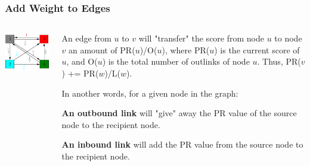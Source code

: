\documentclass{beamer}
\begin{document}
\begin{frame}
\frametitle{Add Weight to Edges}
\begin{columns}
    \begin{column}{0.5\textwidth}
        \includegraphics[width=\textwidth]{weighted.png}
    \end{column}
    \begin{column}{0.5\textwidth}
        \begin{outline}
            
        \end{outline}
        An edge from $u$ to $v$ will "transfer" the score from node $u$ to node $v$ an amount of PR($u$)/O($u$), where PR($u$) is the current score of $u$, and O($u$) is the total number of outlinks of node $u$.  Thus, PR($v$) += PR($w$)/L($w$). 
        
        In another words, for a given node in the graph:

        \textbf{An outbound link} will "give" away the PR value of the source node to the recipient node.  

        \textbf{An inbound link} will add the PR value from the source node to the recipient node.
    \end{column}
\end{columns}
\end{frame}
\end{document}
